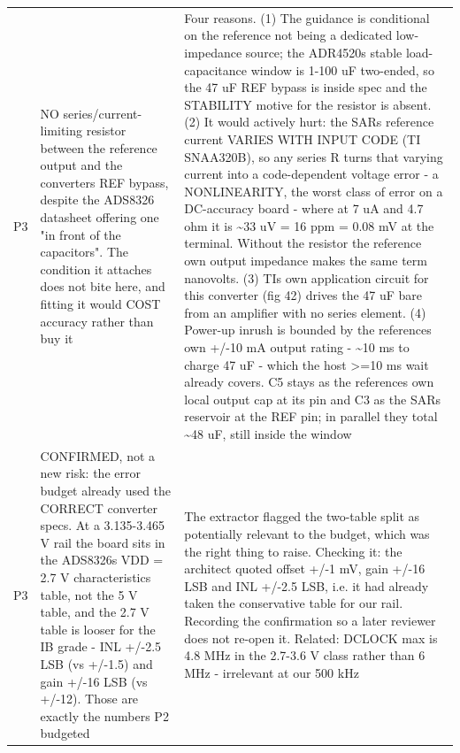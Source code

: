 \documentclass[11pt,a4paper]{article}
\begin{document}
{\begin{longtable}{lp{5.2cm}p{7.2cm}}
P3 & NO series/current-limiting resistor between the reference output and the converters REF bypass, despite the ADS8326 datasheet offering one "in front of the capacitors". The condition it attaches does not bite here, and fitting it would COST accuracy rather than buy it & Four reasons. (1) The guidance is conditional on the reference not being a dedicated low-impedance source; the ADR4520s stable load-capacitance window is 1-100 uF two-ended, so the 47 uF REF bypass is inside spec and the STABILITY motive for the resistor is absent. (2) It would actively hurt: the SARs reference current VARIES WITH INPUT CODE (TI SNAA320B), so any series R turns that varying current into a code-dependent voltage error - a NONLINEARITY, the worst class of error on a DC-accuracy board - where at 7 uA and 4.7 ohm it is \textasciitilde{}33 uV = 16 ppm = 0.08 mV at the terminal. Without the resistor the reference own output impedance makes the same term nanovolts. (3) TIs own application circuit for this converter (fig 42) drives the 47 uF bare from an amplifier with no series element. (4) Power-up inrush is bounded by the references own +/-10 mA output rating - \textasciitilde{}10 ms to charge 47 uF - which the host \textgreater{}=10 ms wait already covers. C5 stays as the references own local output cap at its pin and C3 as the SARs reservoir at the REF pin; in parallel they total \textasciitilde{}48 uF, still inside the window \\
P3 & CONFIRMED, not a new risk: the error budget already used the CORRECT converter specs. At a 3.135-3.465 V rail the board sits in the ADS8326s VDD = 2.7 V characteristics table, not the 5 V table, and the 2.7 V table is looser for the IB grade - INL +/-2.5 LSB (vs +/-1.5) and gain +/-16 LSB (vs +/-12). Those are exactly the numbers P2 budgeted & The extractor flagged the two-table split as potentially relevant to the budget, which was the right thing to raise. Checking it: the architect quoted offset +/-1 mV, gain +/-16 LSB and INL +/-2.5 LSB, i.e. it had already taken the conservative table for our rail. Recording the confirmation so a later reviewer does not re-open it. Related: DCLOCK max is 4.8 MHz in the 2.7-3.6 V class rather than 6 MHz - irrelevant at our 500 kHz \\

\end{longtable}}
\end{document}
